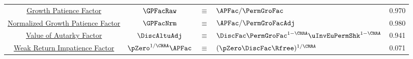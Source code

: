 \begin{table}
{\begin{tabular}{|c|ccl|c|}
        \hyperlink{GPFacRawDefn}{\phantom{Normalized }Growth Patience Factor}    & $\GPFacRaw$ & $\equiv$ & $\APFac/\PermGroFac $      & 0.970 \\
        \href{https://\owner.github.io/BufferStockTheory\#GPFacRawRawDefn}{Normalized Growth Patience Factor}                      & $\GPFacNrm$ & $\equiv$ & $ \APFac/\PermGroFacAdj$& 0.980 \\
        \href{https://\owner.github.io/BufferStockTheory\#VAFacDefn}{Value of Autarky Factor}         & $\DiscAltuAdj $ & $\equiv$ & $ \DiscFac \PermGroFac^{1-\CRRA}\uInvEuPermShk^{1-\CRRA}$       & 0.941 \\
        \href{https://\owner.github.io/BufferStockTheory\#WRICCond}{Weak Return Impatience Factor}         & $\pZero^{1/\CRRA} \APFac $ & $\equiv$ & $ (\pZero \DiscFac \Rfree)^{1/\CRRA}$       & 0.071 \\ \hline
      \end{tabular}
    } %

    \settowidth\TableWidth{\usebox{\TblBox}}
    \savebox{\TblShrunkBox}{
      \settowidth{\TblShrunk}{\usebox{\TblBox}}
      \resizebox{0.9\textwidth}{!}{\begin{minipage}{\TblShrunk}
          \usebox{\TblBox}
        \end{minipage}}
    }

    \usebox{\TblShrunkBox}


  \end{table}
